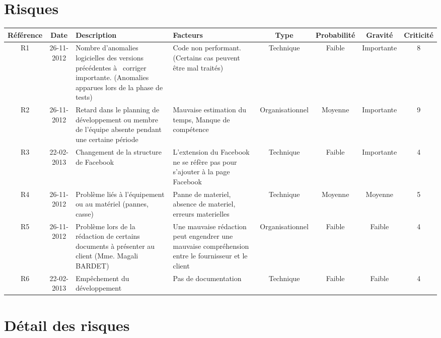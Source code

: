 \documentclass[a4paper,11pt,french]{article}
\begin{document}
\section{Risques}
\begin{flushleft}
\begin{small} 
\begin{tabularx}{18cm}{|c|c|p{2.28cm}|p{2cm}|c|c|c|c|}
\hline
\cellcolor[gray]{.7} Référence & \cellcolor[gray]{.7} Date & 
\cellcolor[gray]{.7}Description & \cellcolor[gray]{.7}Facteurs & 
\cellcolor[gray]{.7}Type & \cellcolor[gray]{.7}Probabilité & 
\cellcolor[gray]{.7}Gravité &
\cellcolor[gray]{.7}Criticité\\
\hline
R1 & 26-11-2012 & 
Nombre d'anomalies logicielles des versions précédentes
à  corriger importante. (Anomalies apparues lors de la phase de tests)
& Code non performant. (Certains cas peuvent être mal traités)
& Technique & Faible & Importante & 8 \\
\hline
R2 & 26-11-2012 &
Retard dans le planning de
développement ou membre de l'équipe absente pendant une certaine période
& Mauvaise estimation du temps, Manque de compétence
& Organisationnel & Moyenne & Importante & 9 \\
\hline 
R3 & 22-02-2013 & Changement de la structure de Facebook
& L'extension du Facebook ne se réfère pas pour s'ajouter à la page Facebook 
& Technique & Faible & Importante & 4 \\
\hline
R4 & 26-11-2012 &
Problème liés à l'équipement ou au matériel (pannes, casse)
& 
Panne de materiel, absence de materiel, erreurs materielles 
& Technique & Moyenne & Moyenne & 5 \\
\hline
R5 & 26-11-2012 & Problème lors de la rédaction de certains documents à
présenter au client (Mme. Magali BARDET)
& Une mauvaise rédaction peut engendrer une mauvaise compréhension entre le
fournisseur et le client
& Organisationnel & Faible & Faible & 4 \\
\hline
R6 & 22-02-2013 & Empêchement du développement
& Pas de documentation
& Technique & Faible & Faible & 4 \\
\hline



\end{tabularx}

\end{small}
\end{flushleft}

\clearpage
\section{Détail des risques}
\end{document}
